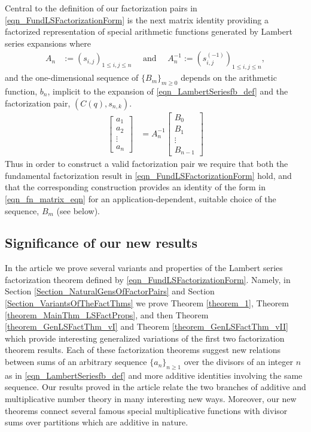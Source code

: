 \documentclass[10pt,reqno]{amsart}
\numberwithin{figure}{section}
\numberwithin{table}{section}
\theoremstyle{plain}
\numberwithin{theorem}{section}
\theoremstyle{remark}
\begin{document}
Central to the definition of our factorization pairs in 
\eqref{eqn_FundLSFactorizationForm} is the next matrix identity 
providing a factorized representation of special arithmetic functions 
generated by Lambert series expansions where 
\begin{align*} 
A_n & := \left(s_{i,j}\right)_{1 \leq i,j \leq n} 
     \quad\text{ and }\quad 
A_n^{-1} := \left(s_{i,j}^{(-1)}\right)_{1 \leq i,j \leq n}, 
\end{align*} 
and the one-dimensional sequence of $\{B_{m}\}_{m \geq 0}$ depends on the 
arithmetic function, $b_n$, implicit to the expansion of 
\eqref{eqn_LambertSeriesfb_def} and the factorization pair, $(C(q), s_{n,k})$. 
\begin{align} 
\label{eqn_fn_matrix_eqn}
\begin{bmatrix} a_1 \\ a_2 \\ \vdots \\ a_n \end{bmatrix} & = 
     A_n^{-1} \begin{bmatrix} B_0 \\ B_1 \\ \vdots \\ B_{n-1} \end{bmatrix} 
\end{align} 
Thus in order to construct a valid factorization pair we require that both 
the fundamental factorization result in 
\eqref{eqn_FundLSFactorizationForm} hold, and that the 
corresponding construction provides an identity of the form in 
\eqref{eqn_fn_matrix_eqn} for an application-dependent, 
suitable choice of the sequence, $B_m$ (see below). 

\subsection{Significance of our new results} 

In the article we prove several variants and properties of the Lambert series 
factorization theorem defined by \eqref{eqn_FundLSFactorizationForm}. 
Namely, in Section \ref{Section_NaturalGensOfFactorPairs} and 
Section \ref{Section_VariantsOfTheFactThms} we prove 
Theorem \ref{theorem_1}, Theorem \ref{theorem_MainThm_LSFactProps}, and then 
Theorem \ref{theorem_GenLSFactThm_vI} and Theorem \ref{theorem_GenLSFactThm_vII} 
which provide interesting generalized variations of the first two factorization 
theorem results. 
Each of these factorization theorems suggest new relations between sums of an arbitrary 
sequence $\{a_n\}_{n \geq 1}$ over the divisors of an integer $n$ as in 
\eqref{eqn_LambertSeriesfb_def} and more additive identities involving the same sequence. 
Our results proved in the article relate the two branches of additive and multiplicative 
number theory in many interesting new ways. 
Moreover, our new theorems connect several famous special multiplicative functions 
with divisor sums over partitions which are additive in nature. 
\end{document}
